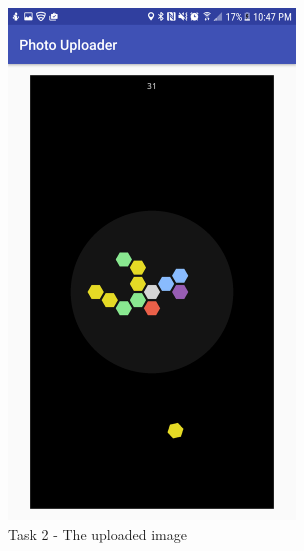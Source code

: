 \documentclass{article}
\begin{document}
	\begin{figure}[ht]
		\includegraphics[width=3in]{img/t2s4.png}
		\centering
		\caption{Task 2 - The uploaded image}
	\end{figure}
\end{document}
